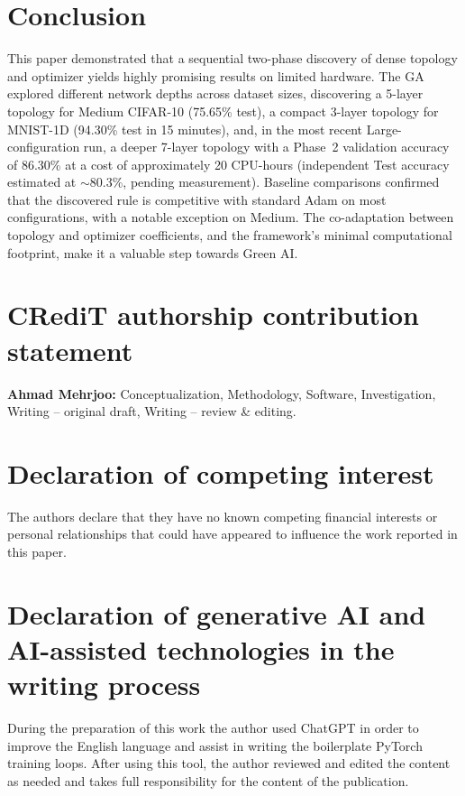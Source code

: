 \documentclass[preprint,12pt,review]{elsarticle}
\begin{document}
\section{Conclusion}\label{sec5}
This paper demonstrated that a sequential two-phase discovery of dense topology and optimizer yields highly promising results on limited hardware. The GA explored different network depths across dataset sizes, discovering a 5-layer topology for Medium CIFAR-10 (75.65\% test), a compact 3-layer topology for MNIST-1D (94.30\% test in 15 minutes), and, in the most recent Large-configuration run, a deeper 7-layer topology with a Phase~2 validation accuracy of 86.30\% at a cost of approximately 20 CPU-hours (independent Test accuracy estimated at $\sim$80.3\%, pending measurement). Baseline comparisons confirmed that the discovered rule is competitive with standard Adam on most configurations, with a notable exception on Medium. The co-adaptation between topology and optimizer coefficients, and the framework's minimal computational footprint, make it a valuable step towards Green AI.


\section*{CRediT authorship contribution statement}
\textbf{Ahmad Mehrjoo:} Conceptualization, Methodology, Software, Investigation, Writing -- original draft, Writing -- review \& editing.

\section*{Declaration of competing interest}
The authors declare that they have no known competing financial interests or personal relationships that could have appeared to influence the work reported in this paper.

\section*{Declaration of generative AI and AI-assisted technologies in the writing process}
During the preparation of this work the author used ChatGPT in order to improve the English language and assist in writing the boilerplate PyTorch training loops. After using this tool, the author reviewed and edited the content as needed and takes full responsibility for the content of the publication.
\end{document}
